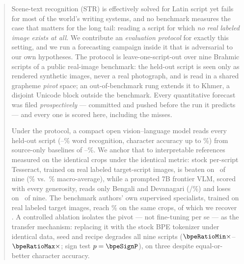 \begin{abstract}
Scene-text recognition (STR) is effectively solved for Latin script yet fails for most of the
world's writing systems, and no benchmark measures the case that matters for the long tail:
reading a script for which \emph{no real labeled image exists at all}. We contribute an
\emph{evaluation protocol} for exactly this setting, and we run a forecasting campaign inside it
that is adversarial to our own hypotheses. The protocol is leave-one-script-out over nine Brahmic
scripts of a public real-image benchmark: the held-out script is seen only as rendered synthetic
images, never a real photograph, and is read in a shared grapheme \emph{pivot} space; an
out-of-benchmark rung extends it to Khmer, a disjoint Unicode block outside the benchmark. Every
quantitative forecast was filed \emph{prospectively} --- committed and pushed before the run it
predicts --- and every one is scored here, including the misses.

Under the protocol, a compact open vision--language model reads every held-out script
(\wrrBmin--\wrrBmax\% word recognition, character accuracy up to \chaBbengali\%) from source-only
baselines of \wrrAtamil--\wrrAdevanagari\%. We anchor that to interpretable references measured on
the identical crops under the identical metric: stock per-script Tesseract, trained on real labeled
target-script images, is beaten on \tessScriptsWon\ of nine (\wrrBmean\% vs.\ \tessMean\%
macro-average), while a prompted 7B frontier VLM, scored with every generosity, reads only Bengali
and Devanagari (\vlmWrrBengali/\vlmWrrDevanagari\%) and loses on \vlmScriptsWon\ of nine.
The benchmark authors' own supervised specialists, trained on real labeled target images, reach
\parseqMean\% on the same crops, of which we recover \oursOverCeiling.
A controlled ablation isolates the pivot --- not fine-tuning per se --- as the transfer mechanism:
replacing it with the stock BPE tokenizer under identical data, seed and recipe degrades all nine
scripts ($\bpeRatioMin\times$--$\bpeRatioMax\times$; sign test $p=\bpeSignP$), on three despite
equal-or-better character accuracy.


\end{abstract}
